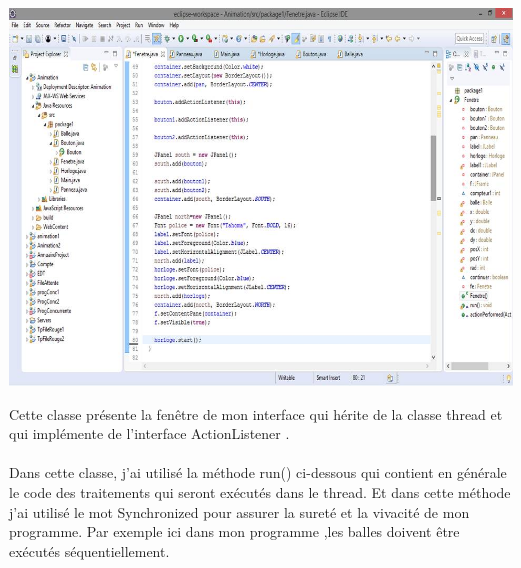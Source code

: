 \documentclass{article}
\begin{document}
\begin{center}
  \includegraphics[scale=0.5]{gg.JPG}
\end{center}

Cette classe présente la fenêtre de mon interface qui hérite de la classe thread et qui implémente de l'interface ActionListener .
\\
\\
Dans cette classe, j'ai utilisé la méthode run() ci-dessous qui contient en générale le code des traitements qui seront exécutés dans le thread. Et dans cette méthode j'ai utilisé le mot Synchronized\cite{synchronized} pour assurer la sureté et la vivacité de mon programme. Par exemple ici dans mon programme ,les balles doivent être exécutés séquentiellement.
\end{document}
